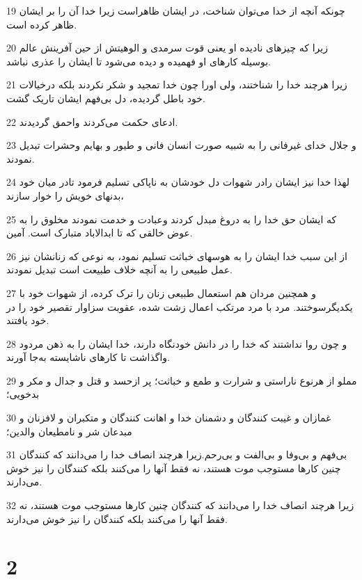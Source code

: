 \par 19 چونکه آنچه از خدا می‌توان شناخت، در ایشان ظاهراست زیرا خدا آن را بر ایشان ظاهر کرده است.
\par 20 زیرا که چیزهای نادیده او یعنی قوت سرمدی و الوهیتش از حین آفرینش عالم بوسیله کارهای او فهمیده و دیده می‌شود تا ایشان را عذری نباشد.
\par 21 زیرا هر‌چند خدا را شناختند، ولی اورا چون خدا تمجید و شکر نکردند بلکه درخیالات خود باطل گردیده، دل بی‌فهم ایشان تاریک گشت.
\par 22 ادعای حکمت می‌کردند واحمق گردیدند.
\par 23 و جلال خدای غیرفانی را به شبیه صورت انسان فانی و طیور و بهایم وحشرات تبدیل نمودند.
\par 24 لهذا خدا نیز ایشان رادر شهوات دل خودشان به ناپاکی تسلیم فرمود تادر میان خود بدنهای خویش را خوار سازند،
\par 25 که ایشان حق خدا را به دروغ مبدل کردند وعبادت و خدمت نمودند مخلوق را به عوض خالقی که تا ابدالاباد متبارک است. آمین.
\par 26 از این سبب خدا ایشان را به هوسهای خباثت تسلیم نمود، به نوعی که زنانشان نیز عمل طبیعی را به آنچه خلاف طبیعت است تبدیل نمودند.
\par 27 و همچنین مردان هم استعمال طبیعی زنان را ترک کرده، از شهوات خود با یکدیگرسوختند. مرد با مرد مرتکب اعمال زشت شده، عقوبت سزاوار تقصیر خود را در خود یافتند.
\par 28 و چون روا نداشتند که خدا را در دانش خودنگاه دارند، خدا ایشان را به ذهن مردود واگذاشت تا کارهای ناشایسته به‌جا آورند.
\par 29 مملو از هرنوع ناراستی و شرارت و طمع و خباثت؛ پر ازحسد و قتل و جدال و مکر و بدخویی؛
\par 30 غمازان و غیبت کنندگان و دشمنان خدا و اهانت کنندگان و متکبران و لافزنان و مبدعان شر و نامطیعان والدین؛
\par 31 بی‌فهم و بی‌وفا و بی‌الفت و بی‌رحم.زیرا هر‌چند انصاف خدا را می‌دانند که کنندگان چنین کارها مستوجب موت هستند، نه فقط آنها را می‌کنند بلکه کنندگان را نیز خوش می‌دارند.
\par 32 زیرا هر‌چند انصاف خدا را می‌دانند که کنندگان چنین کارها مستوجب موت هستند، نه فقط آنها را می‌کنند بلکه کنندگان را نیز خوش می‌دارند.

\chapter{2}

